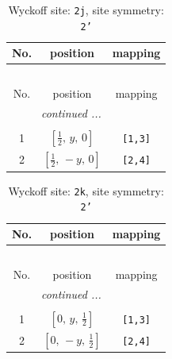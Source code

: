 \documentclass[fleqn,8pt]{jsarticle}
\begin{document}
\renewcommand{\arraystretch}{1.2}
\begin{longtable}{ccc}
\caption{Wyckoff site: {\tt 2j}, site symmetry: {\tt 2'}}
 \\
 \hline \hline
No. & position & mapping \\ \hline \endfirsthead

\multicolumn{2}{l}{\tablename\ \thetable{}} \\
 \hline \hline
No. & position & mapping \\ \hline \endhead

 \hline \hline
\multicolumn{2}{r}{\footnotesize\it continued ...} \\ \endfoot

 \hline \hline
\multicolumn{2}{r}{} \\ \endlastfoot

1 & $\left[ \frac{1}{2},\, y,\, 0 \right]$ & {\tt [1,3]} \\ \hline
2 & $\left[ \frac{1}{2},\, - y,\, 0 \right]$ & {\tt [2,4]} \\
\end{longtable}
\renewcommand{\arraystretch}{1.2}
\begin{longtable}{ccc}
\caption{Wyckoff site: {\tt 2k}, site symmetry: {\tt 2'}}
 \\
 \hline \hline
No. & position & mapping \\ \hline \endfirsthead

\multicolumn{2}{l}{\tablename\ \thetable{}} \\
 \hline \hline
No. & position & mapping \\ \hline \endhead

 \hline \hline
\multicolumn{2}{r}{\footnotesize\it continued ...} \\ \endfoot

 \hline \hline
\multicolumn{2}{r}{} \\ \endlastfoot

1 & $\left[ 0,\, y,\, \frac{1}{2} \right]$ & {\tt [1,3]} \\ \hline
2 & $\left[ 0,\, - y,\, \frac{1}{2} \right]$ & {\tt [2,4]} \\
\end{longtable}
\renewcommand{\arraystretch}{1.2}
\end{document}
